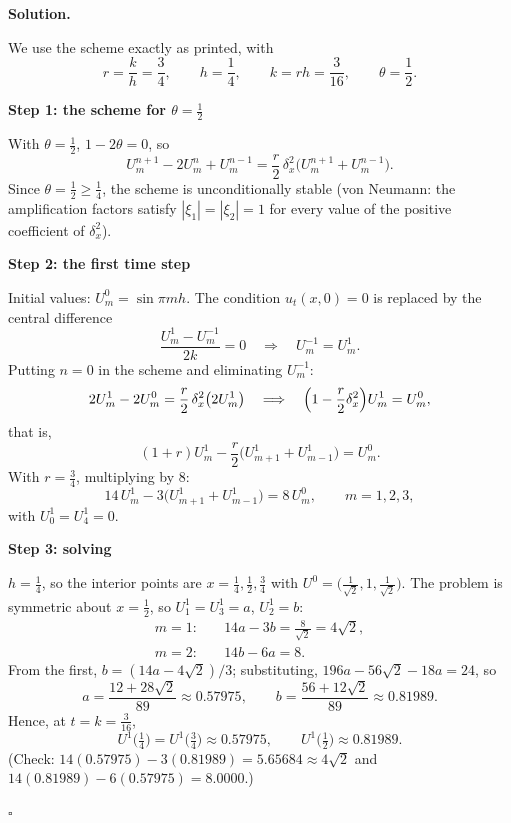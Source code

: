 \documentclass[11pt,a4paper]{article}
\newenvironment{solution}
  {\par\noindent\textbf{Solution.}\par\nobreak}
  {\par\hfill\(\square\)\par}
\newcommand{\step}[1]{\par\addvspace{0.5em}\noindent\textbf{#1}\par\nobreak}
\begin{document}
\begin{solution}
We use the scheme exactly as printed, with
\[
  r=\frac kh=\frac34,\qquad h=\frac14,\qquad k=rh=\frac3{16},\qquad \theta=\frac12 .
\]

\step{Step 1: the scheme for \(\theta=\frac12\)}
With \(\theta=\frac12\), \(1-2\theta=0\), so
\[
  U_m^{n+1}-2U_m^n+U_m^{n-1}
  =\frac r2\,\delta_x^2\bigl(U_m^{n+1}+U_m^{n-1}\bigr).
\]
Since \(\theta=\frac12\ge\frac14\), the scheme is unconditionally
stable (von Neumann: the amplification factors satisfy
\(|\xi_1|=|\xi_2|=1\) for every value of the positive coefficient of
\(\delta_x^2\)).

\step{Step 2: the first time step}
Initial values: \(U_m^0=\sin\pi mh\).  The condition \(u_t(x,0)=0\) is
replaced by the central difference
\[
  \frac{U_m^1-U_m^{-1}}{2k}=0\quad\Longrightarrow\quad U_m^{-1}=U_m^1 .
\]
Putting \(n=0\) in the scheme and eliminating \(U_m^{-1}\):
\[
  2U_m^1-2U_m^0=\frac r2\,\delta_x^2\bigl(2U_m^1\bigr)
  \quad\Longrightarrow\quad
  \Bigl(1-\frac r2\delta_x^2\Bigr)U_m^1=U_m^0,
\]
that is,
\[
  (1+r)U_m^1-\frac r2\bigl(U_{m+1}^1+U_{m-1}^1\bigr)=U_m^0 .
\]
With \(r=\frac34\), multiplying by \(8\):
\[
  14\,U_m^1-3\bigl(U_{m+1}^1+U_{m-1}^1\bigr)=8\,U_m^0,
  \qquad m=1,2,3,
\]
with \(U_0^1=U_4^1=0\).

\step{Step 3: solving}
\(h=\frac14\), so the interior points are \(x=\frac14,\frac12,\frac34\)
with \(U^0=\bigl(\frac1{\sqrt2},1,\frac1{\sqrt2}\bigr)\).  The problem is
symmetric about \(x=\frac12\), so \(U_1^1=U_3^1=a\), \(U_2^1=b\):
\begin{align*}
  m=1:&\quad 14a-3b=\frac{8}{\sqrt2}=4\sqrt2,\\
  m=2:&\quad 14b-6a=8 .
\end{align*}
From the first, \(b=(14a-4\sqrt2)/3\); substituting,
\(196a-56\sqrt2-18a=24\), so
\[
  a=\frac{12+28\sqrt2}{89}\approx0.57975,\qquad
  b=\frac{56+12\sqrt2}{89}\approx0.81989 .
\]
Hence, at \(t=k=\frac3{16}\),
\[
  \boxed{U^1\bigl(\tfrac14\bigr)=U^1\bigl(\tfrac34\bigr)\approx0.57975,\qquad
  U^1\bigl(\tfrac12\bigr)\approx0.81989.}
\]
(Check: \(14(0.57975)-3(0.81989)=5.65684\approx4\sqrt2\) and
\(14(0.81989)-6(0.57975)=8.0000\).)


\end{solution}
\end{document}

